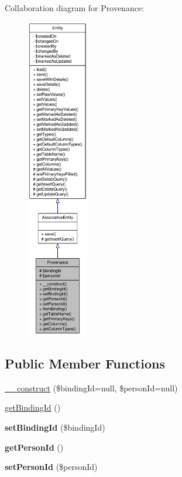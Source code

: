 Collaboration diagram for Provenance:\nopagebreak
\begin{figure}[H]
\begin{center}
\leavevmode
\includegraphics[height=400pt]{classProvenance__coll__graph}
\end{center}
\end{figure}
\subsection*{Public Member Functions}
\begin{DoxyCompactItemize}
\item 
\hyperlink{classProvenance_a12d0b0930da213236d769da23b5b9f9b}{\_\-\_\-construct} (\$bindingId=null, \$personId=null)
\item 
\hyperlink{classProvenance_a5424205b774731f2d7593d3eb54e6139}{getBindingId} ()
\item 
\hypertarget{classProvenance_ac4807d68357d3f3025c949658ba3d4e6}{
{\bfseries setBindingId} (\$bindingId)}
\label{classProvenance_ac4807d68357d3f3025c949658ba3d4e6}

\item 
\hypertarget{classProvenance_a896bd7918291bde6e3a9d271a73f4460}{
{\bfseries getPersonId} ()}
\label{classProvenance_a896bd7918291bde6e3a9d271a73f4460}

\item 
\hypertarget{classProvenance_a51836d2d53b9964d17d83b2e9ddcaa55}{
{\bfseries setPersonId} (\$personId)}
\label{classProvenance_a51836d2d53b9964d17d83b2e9ddcaa55}

\end{DoxyCompactItemize}

